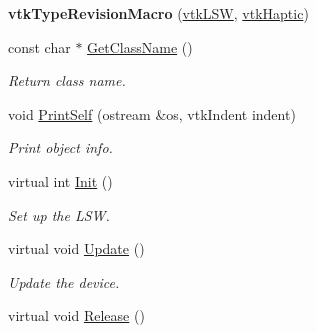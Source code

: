 \begin{DoxyCompactItemize}
\item 
\hypertarget{classvtkLSW_ad0c5588c72275ae36e0e108fab2c8c15}{
{\bfseries vtkTypeRevisionMacro} (\hyperlink{classvtkLSW}{vtkLSW}, \hyperlink{classvtkHaptic}{vtkHaptic})}
\label{classvtkLSW_ad0c5588c72275ae36e0e108fab2c8c15}

\item 
\hypertarget{classvtkLSW_afffd79f78a40160ea9a62c1bad094ddc}{
const char $\ast$ \hyperlink{classvtkLSW_afffd79f78a40160ea9a62c1bad094ddc}{GetClassName} ()}
\label{classvtkLSW_afffd79f78a40160ea9a62c1bad094ddc}

\begin{DoxyCompactList}\small\item\em Return class name. \item\end{DoxyCompactList}\item 
\hypertarget{classvtkLSW_a001db882f577554862a9aeb2738640c4}{
void \hyperlink{classvtkLSW_a001db882f577554862a9aeb2738640c4}{PrintSelf} (ostream \&os, vtkIndent indent)}
\label{classvtkLSW_a001db882f577554862a9aeb2738640c4}

\begin{DoxyCompactList}\small\item\em Print object info. \item\end{DoxyCompactList}\item 
\hypertarget{classvtkLSW_a9de1e9f2b2e3a2ad0e7a92b1597ab2f7}{
virtual int \hyperlink{classvtkLSW_a9de1e9f2b2e3a2ad0e7a92b1597ab2f7}{Init} ()}
\label{classvtkLSW_a9de1e9f2b2e3a2ad0e7a92b1597ab2f7}

\begin{DoxyCompactList}\small\item\em Set up the LSW. \item\end{DoxyCompactList}\item 
\hypertarget{classvtkLSW_ade67f3385b72c50988016692a03e97ae}{
virtual void \hyperlink{classvtkLSW_ade67f3385b72c50988016692a03e97ae}{Update} ()}
\label{classvtkLSW_ade67f3385b72c50988016692a03e97ae}

\begin{DoxyCompactList}\small\item\em Update the device. \item\end{DoxyCompactList}\item 
\hypertarget{classvtkLSW_a69520b1ae3e7549094ba60eb55a41cdf}{
virtual void \hyperlink{classvtkLSW_a69520b1ae3e7549094ba60eb55a41cdf}{Release} ()}
\label{classvtkLSW_a69520b1ae3e7549094ba60eb55a41cdf}


\end{DoxyCompactItemize}
